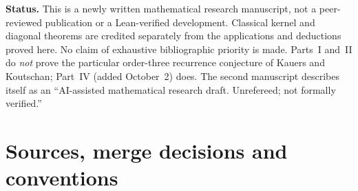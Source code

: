 \documentclass[11pt,a4paper]{article}
\numberwithin{equation}{section}
\theoremstyle{definition}\newtheorem{definition}[theorem]{Definition}
\theoremstyle{remark}\newtheorem{remark}[theorem]{Remark}
\begin{document}
\begin{titlepage}
\begin{minipage}{0.89\textwidth}
\begin{abstract}
Part~II adds the second manuscript's independent results: an elementary
one-large-summand proof of the leading term for every finite labelled
step set and rational balanced composition, a second all-orders route with
a Gaussian-moment algorithm, second-order terms for $r=2,3$, a single giant
primitive component with independent finite decorations and a heavy-tailed
gap, eventual strict log-convexity, and an explicit rounding bound.

Part~IV, from a third manuscript, proves the order-three recurrence that
Kauers and Koutschan conjectured for A215570, by a positive
Legendre-coefficient formula and a rational telescoping certificate, and
computes $\alpha_{5,2},\ldots,\alpha_{5,8}$ exactly.
Part~V, from a fourth, adds the first correction $\alpha_{4,1}$ of A215562.
Part~VI, from two more, proves the main theorems a fifth and a sixth time and
computes $\alpha_{5,2}$ without the recurrence.
\end{abstract}
\end{minipage}
\vfill
\begin{minipage}{0.89\textwidth}\small
\textbf{Status.} This is a newly written mathematical research manuscript,
not a peer-reviewed publication or a Lean-verified development. Classical
kernel and diagonal theorems are credited separately from the applications
and deductions proved here. No claim of exhaustive bibliographic priority
is made. Parts~I and~II do \emph{not} prove the particular order-three
recurrence conjecture of Kauers and Koutschan; Part~IV (added October~2)
does. The second manuscript describes itself as an ``AI-assisted
mathematical research draft. Unrefereed; not formally verified.''
\end{minipage}
\end{titlepage}
\hypersetup{pageanchor=true}
\tableofcontents
\newpage

\section{Sources, merge decisions and conventions}\label{fce:sec:merge}
\end{document}
